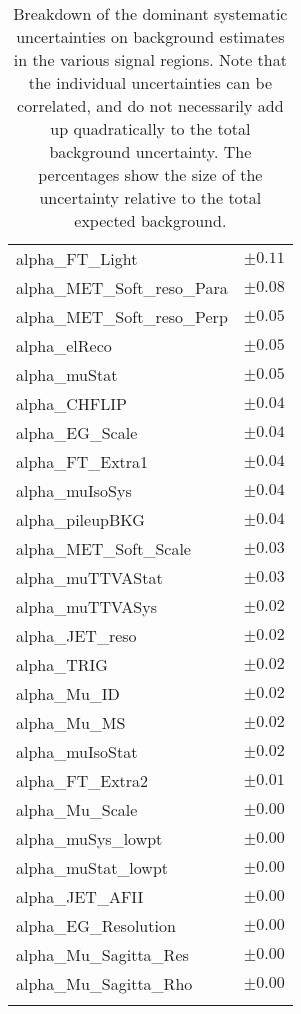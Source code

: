 \begin{table}
\begin{center}
\begin{tabular*}{\textwidth}{@{\extracolsep{\fill}}lc}
alpha\_FT\_Light         & $\pm 0.11$       \\
alpha\_MET\_Soft\_reso\_Para         & $\pm 0.08$       \\
alpha\_MET\_Soft\_reso\_Perp         & $\pm 0.05$       \\
alpha\_elReco         & $\pm 0.05$       \\
alpha\_muStat         & $\pm 0.05$       \\
alpha\_CHFLIP         & $\pm 0.04$       \\
alpha\_EG\_Scale         & $\pm 0.04$       \\
alpha\_FT\_Extra1         & $\pm 0.04$       \\
alpha\_muIsoSys         & $\pm 0.04$       \\
alpha\_pileupBKG         & $\pm 0.04$       \\
alpha\_MET\_Soft\_Scale         & $\pm 0.03$       \\
alpha\_muTTVAStat         & $\pm 0.03$       \\
alpha\_muTTVASys         & $\pm 0.02$       \\
alpha\_JET\_reso         & $\pm 0.02$       \\
alpha\_TRIG         & $\pm 0.02$       \\
alpha\_Mu\_ID         & $\pm 0.02$       \\
alpha\_Mu\_MS         & $\pm 0.02$       \\
alpha\_muIsoStat         & $\pm 0.02$       \\
alpha\_FT\_Extra2         & $\pm 0.01$       \\
alpha\_Mu\_Scale         & $\pm 0.00$       \\
alpha\_muSys\_lowpt         & $\pm 0.00$       \\
alpha\_muStat\_lowpt         & $\pm 0.00$       \\
alpha\_JET\_AFII         & $\pm 0.00$       \\
alpha\_EG\_Resolution         & $\pm 0.00$       \\
alpha\_Mu\_Sagitta\_Res         & $\pm 0.00$       \\
alpha\_Mu\_Sagitta\_Rho         & $\pm 0.00$       \\
\noalign{\smallskip}\hline\noalign{\smallskip}
\end{tabular*}
\end{center}
\caption[Breakdown of uncertainty on background estimates]{
Breakdown of the dominant systematic uncertainties on background estimates in the various signal regions.
Note that the individual uncertainties can be correlated, and do not necessarily add up quadratically to 
the total background uncertainty. The percentages show the size of the uncertainty relative to the total expected background.
\label{table.results.bkgestimate.uncertainties.Rpv2L1bS}}
\end{table}
\clearpage
%